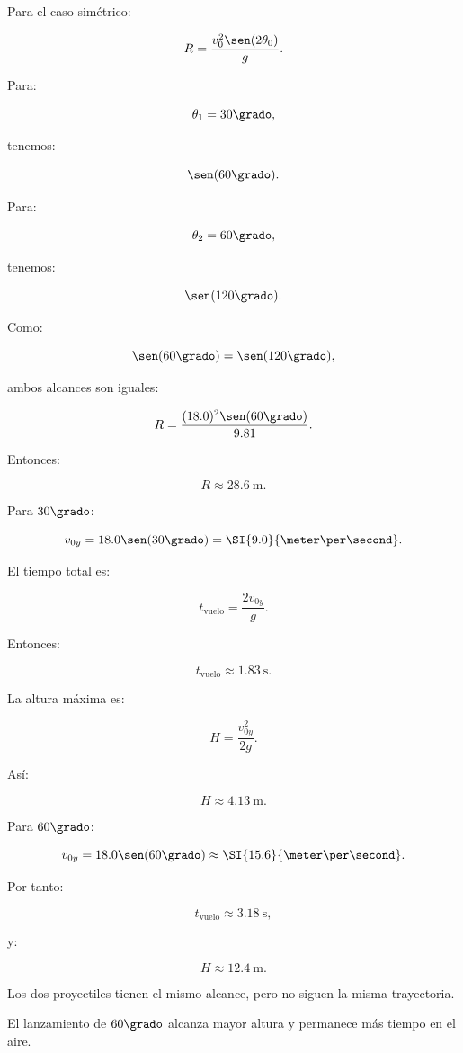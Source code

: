 \begin{explicacion}
Para el caso simétrico:

\[
R
=
\frac{
v_0^2\sen(2\theta_0)
}{
g
}.
\]

Para:

\[
\theta_1=30\grado,
\]

tenemos:

\[
\sen(60\grado).
\]

Para:

\[
\theta_2=60\grado,
\]

tenemos:

\[
\sen(120\grado).
\]

Como:

\[
\sen(60\grado)=\sen(120\grado),
\]

ambos alcances son iguales:

\[
R
=
\frac{
(18.0)^2\sen(60\grado)
}{
9.81
}.
\]

Entonces:

\[
\boxed{
R\approx\SI{28.6}{\meter}
}.
\]

Para \(30\grado\):

\[
v_{0y}
=
18.0\sen(30\grado)
=
\SI{9.0}{\meter\per\second}.
\]

El tiempo total es:

\[
t_{\mathrm{vuelo}}
=
\frac{2v_{0y}}{g}.
\]

Entonces:

\[
\boxed{
t_{\mathrm{vuelo}}
\approx
\SI{1.83}{\second}
}.
\]

La altura máxima es:

\[
H
=
\frac{v_{0y}^2}{2g}.
\]

Así:

\[
\boxed{
H\approx\SI{4.13}{\meter}
}.
\]

Para \(60\grado\):

\[
v_{0y}
=
18.0\sen(60\grado)
\approx
\SI{15.6}{\meter\per\second}.
\]

Por tanto:

\[
\boxed{
t_{\mathrm{vuelo}}
\approx
\SI{3.18}{\second}
},
\]

y:

\[
\boxed{
H\approx\SI{12.4}{\meter}
}.
\]

Los dos proyectiles tienen el mismo alcance, pero no siguen la misma trayectoria.

El lanzamiento de \(60\grado\) alcanza mayor altura y permanece más tiempo en el
aire.
\end{explicacion}


\nivelintermedio


